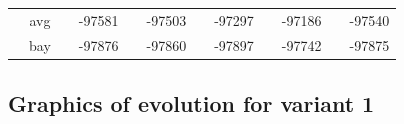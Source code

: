 \documentclass[]{scrartcl}
\begin{document}
\begin{scriptsize}
\begin{center}
\begin{tabular}{cc|cc|cc|cc|cc|cc}
    												    & avg        & & -97581              & & -97503                  & & -97297                 & & -97186                  & & -97540 \\
                                                        & bay        & & -97876              & & -97860                  & & -97897                 & & -97742                 & & -97875 \\                                                                                                                
\end{tabular}
\end{center}
\end{scriptsize}

\newpage

\subsection{Graphics of evolution for variant 1}
\end{document}
